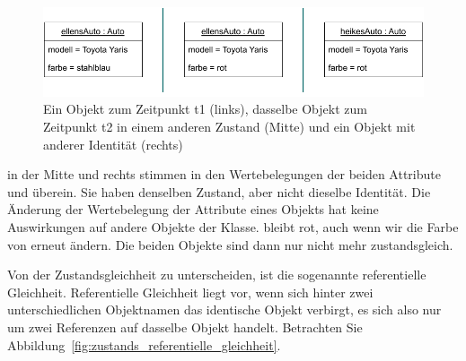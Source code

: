 \begin{figure}[h!]
	\centering
	\includegraphics[scale=1.0]{Bilder/Kapitel-8/identitaet_vs_zustand.pdf}
	\vspace{\baselineskip} %
	\caption[Zustand und Identität]{Ein Objekt zum Zeitpunkt t1 (links), dasselbe Objekt zum Zeitpunkt t2 in einem anderen Zustand (Mitte) und ein Objekt mit anderer Identität (rechts)}
	\label{fig:identitaet_vs_zustand}
\end{figure}

 in der Mitte und  rechts stimmen in den Wertebelegungen der beiden Attribute  und  überein. Sie haben denselben Zustand, aber nicht dieselbe Identität. Die Änderung der Wertebelegung der Attribute eines Objekts hat keine Auswirkungen auf andere Objekte der Klasse.  bleibt rot, auch wenn wir die Farbe von  erneut ändern. Die beiden Objekte sind dann nur nicht mehr zustandsgleich.

\vspace{2mm} %

Von der Zustandsgleichheit 
zu unterscheiden, ist die sogenannte referentielle Gleichheit. Referentielle Gleichheit liegt vor, wenn sich hinter zwei unterschiedlichen 
\linebreak %
Objektnamen das identische Objekt verbirgt, es sich also nur um zwei Referenzen auf dasselbe Objekt handelt. Betrachten Sie Abbildung~\ref{fig:zustands_referentielle_gleichheit}.

